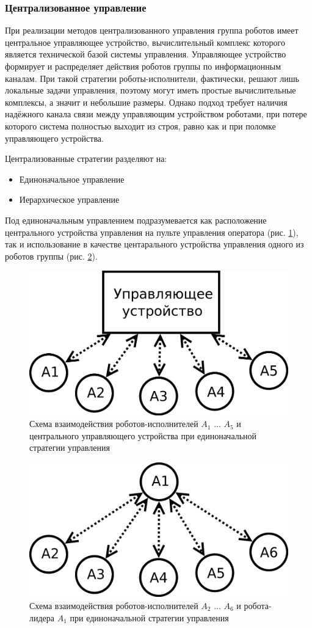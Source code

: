 \documentclass[a4paper, 14pt]{extarticle}
\let\Oldsubsubsection\subsubsection
\renewcommand{\subsubsection}{\FloatBarrier\Oldsubsubsection}
\begin{document}
\subsubsection{Централизованное управление}
При
реализации
методов
централизованного управления группа роботов имеет центральное управляющее устройство,
вычислительный комплекс которого является технической базой системы
управления. Управляющее устройство формирует и распределяет действия роботов группы по информационным каналам. При такой стратегии роботы-исполнители, фактически, решают лишь локальные
задачи управления, поэтому могут иметь простые вычислительные комплексы, а значит и небольшие размеры. Однако подход требует наличия надёжного канала связи между управляющим устройством роботами, при потере которого система полностью выходит из строя, равно как и при поломке управляющего устройства. \par
Централизованные стратегии разделяют на:
\begin{itemize}
	\item Единоначальное управление
	\item Иерархическое управление
\end{itemize}
Под единоначальным управлением подразумевается как расположение центрального устройства управления на пульте управления оператора (рис. \ref{fig:centr-platoon-controll}), так и использование в качестве центарального устройства управления одного из роботов группы (рис. \ref{fig:centr-platoon-agent}). 
\begin{figure}[!htbp]
	\centering
	\includegraphics[width=0.7\linewidth]{others/centr-platoon-controll}
	\caption{Схема взаимодействия роботов-исполнителей $A_1$ ... $A_5$ и центрального управляющего устройства при единоначальной стратегии управления}
	\label{fig:centr-platoon-controll}
\end{figure}
\begin{figure}[!htbp]
	\centering
	\includegraphics[width=0.7\linewidth]{others/centr-platoon-agent}
	\caption{Схема взаимодействия роботов-исполнителей $A_2$ ... $A_6$ и робота-лидера $A_1$ при единоначальной стратегии управления}
	\label{fig:centr-platoon-agent}
\end{figure}
\end{document}
